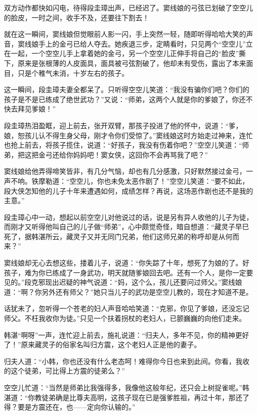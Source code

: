 \documentclass[12pt,oneside]{book}
\begin{document}
双方动作都快如闪电，待得段圭璋出声，已经迟了。窦线娘的弓弦已划破了空空儿的脸皮，一时之间，收手不及，还要往下割去！

就在这一瞬间，窦线娘但觉眼前人影一闪，手上突然一轻，随即听得哈哈大笑的声音，窦线娘手上的金弓已给人夺去。她疾退三步，定睛看时，只见两个``空空儿''立在一起，一个空空儿手上拿着她的金弓，另一个空空儿正伸手将自己的``脸皮''撕下，原来是张根薄的人皮面具，面具被弓弦割破了，他却未有受伤，露出了本来面目，只是个稚气未消，十岁左右的孩子。

这一瞬间，段圭璋夫妻全都呆了。只听得空空儿笑道：``我没有骗你们吧？你们的孩子是不是已练成了绝世武功？''又说：``师弟，这两个人就是你的爹娘了，你还不快去拜见爹娘！''

段圭璋热泪盈眶，迎上前去，张开双臂，那孩子投进了他的怀中，说道：``爹，娘，恕孩儿认不得生身父母，刚才令你们受惊了。''窦线娘这时方始走过神来，连忙也抢上前去，将孩子揽住，说道：``好孩子，我没有伤着你吧？''空空儿笑道：``师弟，把这把金弓还给你妈妈吧！窦女侠，这回你不会再骂我了吧？''

窦线娘给他弄得啼笑皆非，有几分气恼，却也有几分感激，只好默然接过金弓，一声不响。铁摩勒道：``空空儿，你也未免太恶作剧了！''空空儿笑道：``要不如此，段大侠怎知他的儿子十年来遭遇如何，成绩怎样？再说，这场恶作剧也还不是我的主意。''

段圭璋心中一动，想起以前空空儿对他说过的话，说是另有异人收他的儿子为徒，而刚才又听得他叫自己的儿子做``师弟''，心中颇觉奇怪，暗自想道：``藏灵子早巳死了，据韩湛所云，藏灵子又并无同门兄弟，他们这师兄弟的称呼却是从何而来？''

窦线娘却无心去想这些，搂着儿子，说道：``你失踪了十年，想死了为娘的了。好孩子，难为你已练成了一身武功，明天就随爹娘回去吧。还有一个人，是你一定要见的。''段克邪现出迟疑的神气说道：``妈，这个么，孩儿还要问过师父。''窦线娘道：``啊？你另外还有师父？''她只当儿子的武功是空空儿教的，现在才知道不是。

话犹未了，忽听得一个苍老的妇人声音哈哈笑道：``克邪，你见了爹娘，还没忘记师父。不枉我收你为徒。''只见一个扶着拐杖的老妇人，已颤巍巍的向他们走来。

韩湛``啊呀''一声，连忙迎上前去，施礼说道：``归夫人，多年不见，你的精神更好了！''原来藏灵子的俗家名叫归方震，这个老妇人正是他的妻子。

归夫人道：``小韩，你也还没有什么老态呵！难得你今日也来到此间。你看，我收的这个徒弟，可比得上方震的徒弟么？''

空空儿忙道：``当然是师弟比我强得多，我像他这般年纪，还只会上树捉雀呢。''韩湛道：``你教徒弟确是比尊夫高明，这孩子现在已是强爹胜祖，再过十年，那还了得？要是方震还在，也------定向你认输的。''
\end{document}
